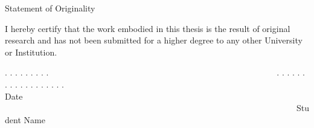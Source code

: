 \thispagestyle{empty}



\begin{center}
	\large{Statement of Originality}
\end{center}


I hereby certify that the work embodied in this thesis is the result of original research and has not been submitted for a higher degree to any other University or Institution.


\vfill

\begin{center}
	. . . . . . . . .~~~~~~~~~~~~~~~~~~~~~~~~~~~~~~~~~~~~~~~~~~~~~~~~~~~~~~. . . . . . . . . . . . . . . . . .\\
	Date ~~~~~~~~~~~~~~~~~~~~~~~~~~~~~~~~~~~~~~~~~~~~~~~~~~~~~~~~~~~~~~~~~~~~~Student Name
\end{center}

\vspace{16em}

\cleardoublepage
